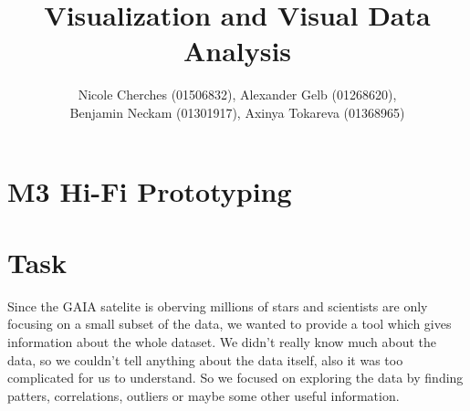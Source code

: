 \documentclass{article}
\begin{document}
\title{Visualization and Visual Data Analysis}
\author{Nicole Cherches (01506832), Alexander Gelb (01268620), \\Benjamin Neckam (01301917), Axinya Tokareva (01368965)}
\maketitle
\section*{M3  Hi-Fi Prototyping}
\section{Task}
Since the GAIA satelite is oberving millions of stars and scientists are only focusing on a small subset of the data, we wanted to provide a tool which gives information about the whole dataset. 
We didn't really know much about the data, so we couldn't tell anything about the data itself, also it was too complicated for us to understand. So we focused on exploring the data by finding patters, correlations, outliers or maybe some other useful information.\\
\end{document}
